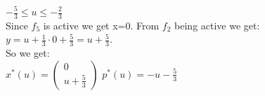 \documentclass[fleqn]{article}
\begin{document}
\underline{$-\frac{5}{3} \leq u \leq -\frac{2}{3}$} \\
Since $f_5$ is active we get x=0. From $f_2$ being active we get: $y = u+\frac{1}{3}\cdot 0 +\frac{5}{3} = u +\frac{5}{3}$.\\
So we get: \\

$\boxed{x^*(u) = \begin{pmatrix}
           0 \\
           u +\frac{5}{3} 
         \end{pmatrix}}$
$\boxed{p^*(u) = -u -\frac{5}{3}}$

 
\end{document}
